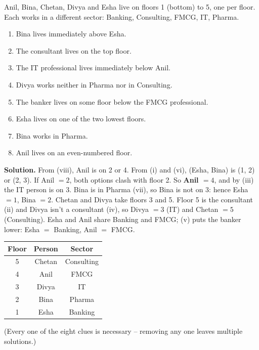\documentclass[11pt,a4paper,openany]{report}
\begin{document}
\begin{example}
Anil, Bina, Chetan, Divya and Esha live on floors 1 (bottom) to 5, one per floor. Each works in a different sector: Banking, Consulting, FMCG, IT, Pharma.
\begin{enumerate}[nosep,label=(\roman*)]
\item Bina lives immediately above Esha.
\item The consultant lives on the top floor.
\item The IT professional lives immediately below Anil.
\item Divya works neither in Pharma nor in Consulting.
\item The banker lives on some floor below the FMCG professional.
\item Esha lives on one of the two lowest floors.
\item Bina works in Pharma.
\item Anil lives on an even-numbered floor.
\end{enumerate}

\textbf{Solution.} From (viii), Anil is on 2 or 4.
From (i) and (vi), (Esha, Bina) is (1, 2) or (2, 3).
If Anil $=2$, both options clash with floor 2. So \textbf{Anil $=4$}, and by (iii) the IT person is on 3.
Bina is in Pharma (vii), so Bina is not on 3: hence Esha $=1$, Bina $=2$. Chetan and Divya take floors 3 and 5.
Floor 5 is the consultant (ii) and Divya isn't a consultant (iv), so Divya $=3$ (IT) and Chetan $=5$ (Consulting).
Esha and Anil share Banking and FMCG; (v) puts the banker lower: Esha $=$ Banking, Anil $=$ FMCG.

\begin{center}
\begin{tabular}{ccc}
\toprule Floor & Person & Sector\\\midrule
5 & Chetan & Consulting\\ 4 & Anil & FMCG\\ 3 & Divya & IT\\ 2 & Bina & Pharma\\ 1 & Esha & Banking\\\bottomrule
\end{tabular}
\end{center}
(Every one of the eight clues is necessary -- removing any one leaves multiple solutions.)
\end{example}
\end{document}
